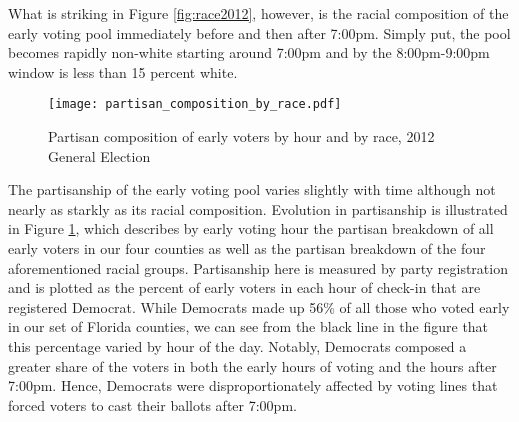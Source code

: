 \documentclass[12pt,titlepage]{article}
\begin{document}



What is striking in Figure \ref{fig:race2012}, however, is the racial
composition of the early voting pool immediately before and then after
7:00pm.  Simply put, the pool becomes rapidly non-white starting
around 7:00pm and by the 8:00pm-9:00pm window is less than 15 percent
white.

\begin{figure}[!ht]
\caption{Partisan composition of early voters by hour and by race, 2012
  General Election}
  \label{fig:party2012}
  \centering
    \centering\texttt{[image: partisan\_composition\_by\_race.pdf]}
\end{figure}

The partisanship of the early voting pool varies slightly with time
although not nearly as starkly as its racial composition.  Evolution
in partisanship is illustrated in Figure \ref{fig:party2012}, which
describes by early voting hour the partisan breakdown of all early
voters in our four counties as well as the partisan breakdown of the
four aforementioned racial groups.  Partisanship here is measured by
party registration and is plotted as the percent of early voters in
each hour of check-in that are registered Democrat.  While Democrats
made up 56\% of all those who voted early in our set of Florida
counties, we can see from the black line in the figure that this
percentage varied by hour of the day.  Notably, Democrats composed a
greater share of the voters in both the early hours of voting and the
hours after 7:00pm.  Hence, Democrats were disproportionately affected
by voting lines that forced voters to cast their ballots after 7:00pm.
\end{document}
